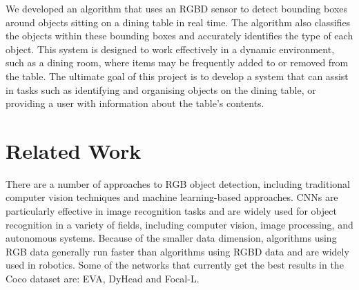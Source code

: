 \documentclass[10pt,twocolumn,letterpaper]{article}
\begin{document}
We developed an algorithm that uses an RGBD sensor to detect bounding boxes around objects sitting on a dining table in real time. The algorithm also classifies the objects within these bounding boxes and accurately identifies the type of each object. This system is designed to work effectively in a dynamic environment, such as a dining room, where items may be frequently added to or removed from the table. The ultimate goal of this project is to develop a system that can assist in tasks such as identifying and organising objects on the dining table, or providing a user with information about the table's contents.

\section{Related Work}

There are a number of approaches to RGB object detection, including traditional computer vision techniques and machine learning-based approaches. CNNs are particularly effective in image recognition tasks and are widely used for object recognition in a variety of fields, including computer vision, image processing, and autonomous systems. Because of the smaller data dimension, algorithms using RGB data generally run faster than algorithms using RGBD data and are widely used in robotics. Some of the networks that currently get the best results in the Coco dataset are: EVA\cite{EVA}, DyHead\cite{DYHEAD} and Focal-L\cite{Focal-L}. 
\end{document}
